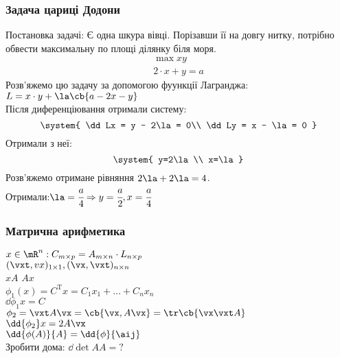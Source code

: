 \subsubsection{Задача цариці Додони}
Постановка задачі: Є одна шкура вівці. Порізавши її на довгу нитку, потрібно обвести максимальну по площі ділянку біля моря.
\begin{eqnarray}
\max xy\\
2\cdot x+ y  = a
\end{eqnarray}
Розв’яжемо цю задачу за допомогою фуункції Лагранджа: $L=x\cdot y +\la\cb{a-2x-y}$\\
Після диференціювання отримали систему:
\begin{equation}
\system{
\dd Lx = y - 2\la = 0\\
\dd Ly = x - \la = 0
}
\end{equation}
Отримали з неї: \\
\begin{equation}
\system{
y=2\la \\
x=\la
}
\end{equation}
Розв’яжемо отримане рівняння $2\la+2\la=4$.\\
Отримали:$\la = \cfrac a4 \Rightarrow y=\cfrac a2,x=\cfrac a4$
\subsubsection{Матрична арифметика}
$x\in\mR^n: C_{m\times p} = A_{m\times n} \cdot L_{n\times p}$\\
$(\vxt,vx)_{1\times1},(\vx,\vxt)_{n\times n}$\\
$xA$ %
$Ax$ \\
$\phi_1(x)=C^\mathrm{T}x = C_1x_1+\ldots + C_nx_n$\\
$\dd{\phi_1}{x} = C$\\
$\phi_2  = \vxt A \vx = \cb{\vx,A\vx} = \tr \cb{\vx\vxt A}$\\
$\dd{\phi_2}x = 2A\vx$\\
$\dd{\phi(A)}{A} = \dd{\phi}{\aij}$\\
Зробити дома: $\dd{\det A}{A}=?$\\
